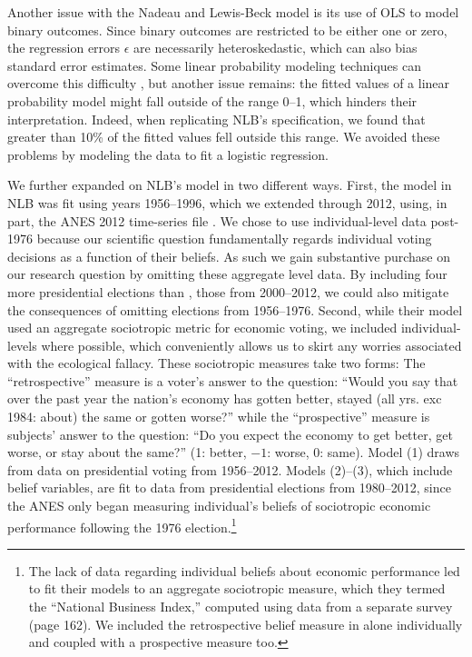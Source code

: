 \documentclass[11pt]{article}
\begin{document}
 

Another issue with the Nadeau and Lewis-Beck model is its use of OLS to model binary outcomes. Since binary outcomes are restricted to be either one or zero, the regression errors $\epsilon$ are necessarily heteroskedastic, which can also bias standard error estimates. Some linear probability modeling techniques can overcome this difficulty \citep[see, e.g.][ sec. 4.6]{agresti2002categorical}, but another issue remains: the fitted values of a linear probability model might fall outside of the range 0--1, which hinders their interpretation. Indeed, when replicating NLB's specification, we found that greater than 10\% of the fitted values fell outside this range. We avoided these problems by modeling the data to fit a logistic regression.%



We further expanded on NLB's model in two different ways. First, the model in NLB was fit using years 1956--1996, which we extended through 2012, using, in part, the ANES 2012 time-series file \cite{ANES2012}. 
We chose to use individual-level data post-1976 because our scientific question fundamentally regards individual voting decisions as a function of their beliefs. As such we gain substantive purchase on our research question by omitting these aggregate level data. By including four more presidential elections than \citet{Nadeau:2001tw}, those from 2000--2012, we could also mitigate the consequences of omitting elections from 1956--1976.
Second, while their model used an aggregate sociotropic metric for economic voting, we included individual-levels where possible, which conveniently allows us to skirt any worries associated with the ecological fallacy. These sociotropic measures take two forms:
The ``retrospective'' measure is a voter's answer to the question: ``Would you say that over the past year the nation's economy has gotten better, stayed (all yrs. exc 1984: about) the same or gotten worse?'' while
 the ``prospective'' measure is subjects' answer to the question: ``Do you expect the economy to get better, get
worse, or stay about the same?'' (1: better, $-1$: worse, 0: same). Model (1) draws from data on presidential voting from 1956--2012. Models (2)--(3), which include belief variables, are fit to data from presidential elections from 1980--2012, since the ANES only began measuring individual's beliefs of sociotropic economic performance following the 1976 election.\footnote{The lack of data regarding individual beliefs about economic performance led \citet{Nadeau:2001tw} to fit their models to an aggregate sociotropic measure, which they termed the ``National Business Index,'' computed using data from a separate survey (page 162). We included the retrospective belief measure in alone individually and coupled with a prospective measure too.}
\end{document}
